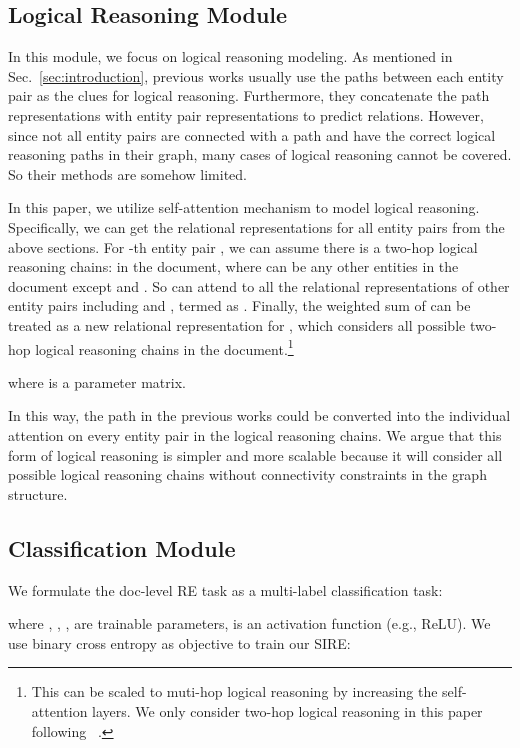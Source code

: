 \documentclass[11pt,a4paper]{article}
\begin{document}
\subsection{Logical Reasoning Module\label{ssec:reasoning}}
In this module, we focus on logical reasoning modeling. As mentioned in Sec.~\ref{sec:introduction}, previous works usually use the paths between each entity pair as the clues for logical reasoning. Furthermore, they concatenate the path representations with entity pair representations to predict relations. However, since not all entity pairs are connected with a path and have the correct logical reasoning paths in their graph, many cases of logical reasoning cannot be covered. So their methods are somehow limited.

In this paper, we utilize self-attention mechanism \citep{transformer} to model logical reasoning. Specifically, we can get the relational representations for all entity pairs from the above sections. For -th entity pair , we can assume there is a two-hop logical reasoning chains:  in the document, where  can be any other entities in the document except  and . So  can attend to all the relational representations of other entity pairs including  and , termed as . Finally, the weighted sum of  can be treated as a new relational representation for , which considers all possible two-hop logical reasoning chains in the document.\footnote{This can be scaled to muti-hop logical reasoning by increasing the self-attention layers. We only consider two-hop logical reasoning in this paper following ~\citet{GAIN}.}


where   is a parameter matrix.

In this way, the path in the previous works could be converted into the individual attention on every entity pair in the logical reasoning chains. We argue that this form of logical reasoning is simpler and more scalable because it will consider all possible logical reasoning chains without connectivity constraints in the graph structure. 




\subsection{Classification Module\label{ssec:classification}}
We formulate the doc-level RE task as a multi-label classification task:

where , , ,  are trainable parameters,  is an activation function (e.g., ReLU). We use binary cross entropy as objective to train our SIRE:
\end{document}
